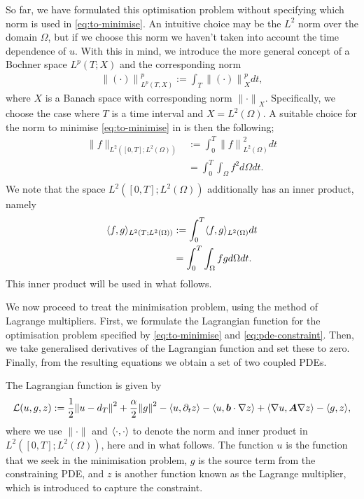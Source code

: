 \documentclass{article}  %
\begin{document}
So far, we have formulated this optimisation problem without specifying which norm is used in \autoref{eq:to-minimise}. An intuitive choice may be the $L^2$ norm over the domain $\Omega$, but if we choose this norm we haven't taken into account the time dependence of $u$. With this in mind, we introduce the more general concept of a Bochner space $L^p(T;X)$ and the corresponding norm
%
\begin{align} 
    {\lVert (\cdot) \rVert}^p_{L^p(T,X)} := \int_{T} {\lVert (\cdot)\rVert}^p_X dt, 
\end{align}
%
where $X$ is a Banach space with corresponding norm ${\lVert \cdot\rVert}_X$. Specifically, we choose the case where $T$ is a time interval and $X=L^2(\Omega)$. A suitable choice for the norm to minimise \autoref{eq:to-minimise} in is then the following;
%
\begin{align} 
    \lVert f \rVert_{L^2([0,T];L^2(\Omega))} &:= \int_{0}^{T}  {\lVert f \rVert}^2_{L^2(\Omega)} dt\\
    &= \int_{0}^{T} \int_{\Omega} f^2 d\Omega dt.\\
\end{align}
%
We note that the space $L^2([0,T];L^2(\Omega))$ additionally has an inner product, namely
%
\begin{align} 
    \langle f, g \rangle_{L^2(T;L^2(\Omega))} &:= \int_{0}^{T} \langle f, g \rangle_{L^2(\Omega)} dt \\
    & = \int_{0}^{T} \int_{\Omega} fg d\Omega dt.
\end{align}
%
This inner product will be used in what follows.

We now proceed to treat the minimisation problem, using the method of Lagrange multipliers. First, we formulate the Lagrangian function for the optimisation problem specified by \autoref{eq:to-minimise} and \autoref{eq:pde-constraint}. Then, we take generalised derivatives of the Lagrangian function and set these to zero. Finally, from the resulting equations we obtain a set of two coupled PDEs.

The Lagrangian function is given by
%
\begin{align} 
    \mathcal{L}(u,g,z) := \frac{1}{2} {\lVert u - d_T \rVert}^2 + \frac{\alpha}{2} {\lVert g \rVert}^2 - \langle u, \partial_t z \rangle - \langle u, \boldsymbol{b} \cdot \nabla z \rangle + \langle \nabla u, \boldsymbol{A} \nabla z \rangle - \langle g, z \rangle,
\end{align}
%
where we use $\lVert \cdot \rVert$ and $\langle \cdot, \cdot \rangle$ to denote the norm and inner product in $L^2([0,T];L^2(\Omega))$, here and in what follows. The function $u$ is the function that we seek in the minimisation problem, $g$ is the source term from the constraining PDE, and $z$ is another function known as the Lagrange multiplier, which is introduced to capture the constraint.
\end{document}
